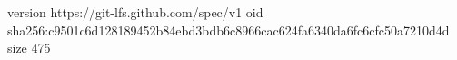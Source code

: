 version https://git-lfs.github.com/spec/v1
oid sha256:c9501c6d128189452b84ebd3bdb6c8966cac624fa6340da6fc6cfc50a7210d4d
size 475
